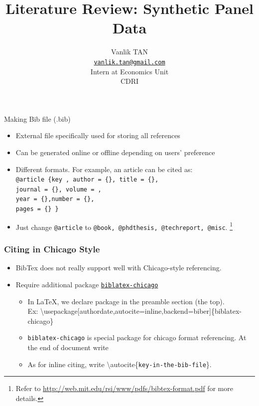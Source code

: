 \documentclass[xcolor=dvipsnames]{beamer} %
\title[Synthetic Panel Data]{Literature Review: Synthetic Panel Data}%
\author[Vanlik TAN (Econ Unit)]{Vanlik TAN\\
\texttt{\href{mailto:vanlik.tan@gmail.com}{vanlik.tan@gmail.com}}\\Intern at Economics Unit \\ CDRI}
\begin{document}
\begin{frame}
  \titlepage
\end{frame}


\begin{frame}{Making Bib file (.bib)}

\begin{itemize}
    \item External file specifically used for storing all references 
    \item Can be generated online or offline depending on users' preference
    \item Different formats. For example, an article can be cited as:\\
    \texttt{@article \{key ,
author = \{\}, title = \{\},\\
journal = \{\}, volume = {},\\
year = \{\},number = \{\},\\
pages = \{\}
\}
}
    \item Just change \texttt{@article} to \texttt{@book, @phdthesis, @techreport, @misc}. \footnote{Refer to \href{http://web.mit.edu/rsi/www/pdfs/bibtex-format.pdf}{http://web.mit.edu/rsi/www/pdfs/bibtex-format.pdf} for more details.}
\end{itemize}
\end{frame}

\begin{frame}
\frametitle{Citing in Chicago Style}
    \begin{itemize}
        \item BibTex does not really support well with Chicago-style referencing.
        \item Require additional package \href{https://ctan.org/pkg/biblatex-chicago?lang=en}{\texttt{biblatex-chicago}}
        \begin{itemize}
            \item In \LaTeX, we declare package in the preamble section (the top). \\Ex:     \textbackslash usepackage[authordate,autocite=inline,backend=biber]\{biblatex-chicago\}
            \item \texttt{biblatex-chicago} is special package for chicago format referencing. At the end of document write \printbiblography
            \item As for inline citing, write \textbackslash autocite\{\texttt{key-in-the-bib-file}\}.
            
        \end{itemize}
    \end{itemize}

\end{frame}
\end{document}
